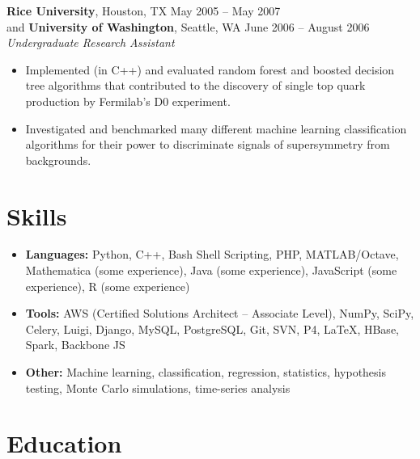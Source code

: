 \documentclass[margin,line]{resume}
\begin{document}
\begin{resume}
    \textbf{Rice University}, Houston, TX \hfill May 2005 -- May 2007 \vspace{1mm}\\\vspace{1mm}%
    and \textbf{University of Washington}, Seattle, WA \hfill June 2006 -- August 2006 \vspace{1mm}\\\vspace{1mm}%
    \textsl{Undergraduate Research Assistant}
    \begin{itemize}
    \item Implemented (in C++) and evaluated random forest and boosted decision tree algorithms that contributed to the discovery of single top quark production by Fermilab's D0 experiment.
    \item Investigated and benchmarked many different machine learning classification algorithms for their power to discriminate signals of supersymmetry from backgrounds.
    \end{itemize}
    
    \section{\mysidestyle Skills}\vspace{0mm}%
    \begin{itemize}
    \item \textbf{Languages:} Python, C++, Bash Shell Scripting, PHP, MATLAB/Octave, Mathematica (some experience), Java (some experience), JavaScript (some experience), R (some experience)
    \item \textbf{Tools:} AWS (Certified Solutions Architect -- Associate Level), NumPy, SciPy, Celery, Luigi, Django, MySQL, PostgreSQL, Git, SVN, P4, \LaTeX, HBase, Spark, Backbone JS
    \item \textbf{Other:} Machine learning, classification, regression, statistics, hypothesis testing, Monte Carlo simulations, time-series analysis
    \end{itemize}
    
    \section{\mysidestyle Education}


\end{resume}
\end{document}
